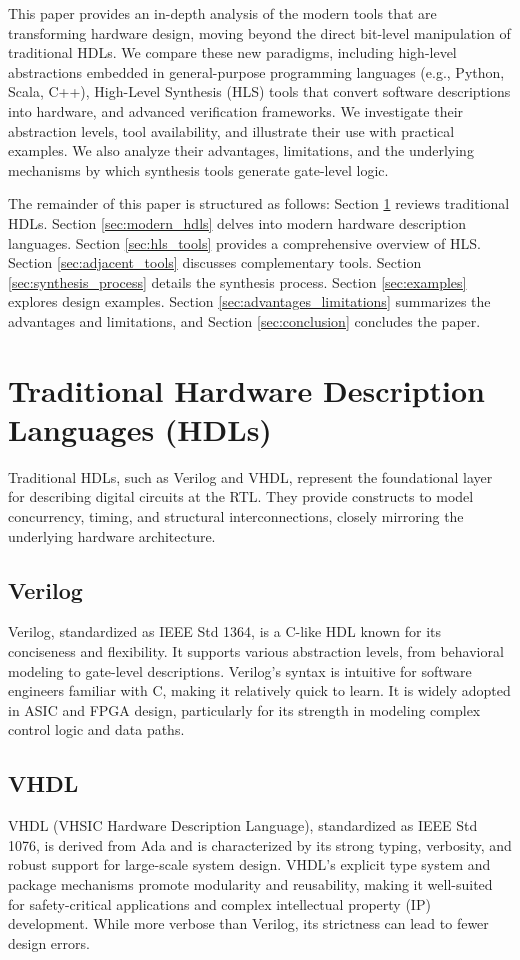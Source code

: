 \documentclass[sigconf, anonymous=false]{acmart} %
\begin{document}
This paper provides an in-depth analysis of the modern tools that are transforming hardware design, moving beyond the direct bit-level manipulation of traditional HDLs. We compare these new paradigms, including high-level abstractions embedded in general-purpose programming languages (e.g., Python, Scala, C++), High-Level Synthesis (HLS) tools that convert software descriptions into hardware, and advanced verification frameworks. We investigate their abstraction levels, tool availability, and illustrate their use with practical examples. We also analyze their advantages, limitations, and the underlying mechanisms by which synthesis tools generate gate-level logic.

The remainder of this paper is structured as follows: Section \ref{sec:traditional_hdls} reviews traditional HDLs. Section \ref{sec:modern_hdls} delves into modern hardware description languages. Section \ref{sec:hls_tools} provides a comprehensive overview of HLS. Section \ref{sec:adjacent_tools} discusses complementary tools. Section \ref{sec:synthesis_process} details the synthesis process. Section \ref{sec:examples} explores design examples. Section \ref{sec:advantages_limitations} summarizes the advantages and limitations, and Section \ref{sec:conclusion} concludes the paper.

\section{Traditional Hardware Description Languages (HDLs)}
\label{sec:traditional_hdls}
Traditional HDLs, such as Verilog and VHDL, represent the foundational layer for describing digital circuits at the RTL. They provide constructs to model concurrency, timing, and structural interconnections, closely mirroring the underlying hardware architecture.

\subsection{Verilog}
Verilog, standardized as IEEE Std 1364, is a C-like HDL known for its conciseness and flexibility. It supports various abstraction levels, from behavioral modeling to gate-level descriptions. Verilog's syntax is intuitive for software engineers familiar with C, making it relatively quick to learn. It is widely adopted in ASIC and FPGA design, particularly for its strength in modeling complex control logic and data paths.

\subsection{VHDL}
VHDL (VHSIC Hardware Description Language), standardized as IEEE Std 1076, is derived from Ada and is characterized by its strong typing, verbosity, and robust support for large-scale system design. VHDL's explicit type system and package mechanisms promote modularity and reusability, making it well-suited for safety-critical applications and complex intellectual property (IP) development. While more verbose than Verilog, its strictness can lead to fewer design errors.
\end{document}
